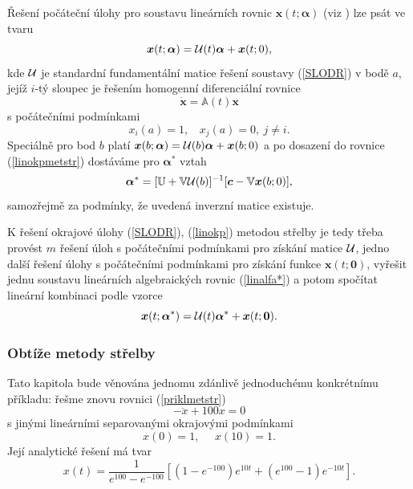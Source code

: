 \documentclass[a4paper, 12pt]{book}
\theoremstyle{definition}
\def\vc#1{\mathbf{\boldsymbol{#1}}}     %
\def\tn#1{{\mathbb{#1}}}    %
\begin{document}
Řešení počáteční úlohy pro soustavu lineárních rovnic $\vc x(t;\vc\alpha)$ (viz 
\cite{Nagy}) lze psát ve tvaru
\begin{displaymath}
\vc x(t;\vc\alpha)={\cal U}(t)\vc\alpha+\vc x(t;0),
\end{displaymath}
kde $\cal U$ je standardní fundamentální matice řešení soustavy 
(\ref{SLODR}) v bodě $a$, jejíž $i$-tý sloupec je řešením homogenní diferenciální 
rovnice
\begin{equation}\label{DRproSFM}
\dot {\vc x}={\tn A}(t)\vc x
\end{equation}
s počátečními podmínkami
\begin{equation}\label{OKPproSFM}
x_i(a)=1, ~~~~ x_j(a)=0, ~j\neq i.
\end{equation}
Speciálně pro bod $b$ platí $\vc x(b;\vc\alpha)={\cal U}(b)\vc\alpha+\vc x(b;0)$ a po
dosazení do rovnice (\ref{linokpmetstr}) dostáváme pro $\vc\alpha^*$ vztah
\begin{equation}\label{linalfa*}
\vc\alpha^* = [{\tn U}+{\tn V}{\cal U}(b)]^{-1}[\vc c-{\tn V}\vc x(b;0)],
\end{equation}
samozřejmě za podmínky, že uvedená inverzní matice existuje.

K řešení okrajové úlohy (\ref{SLODR}), (\ref{linokp}) metodou střelby je tedy
třeba provést $m$ řešení úloh s počátečními podmínkami pro získání matice $\cal U$,
jedno další řešení úlohy s počátečními podmínkami pro získání funkce $\vc x(t;\vc 0)$,
vyřešit jednu soustavu lineárních algebraických rovnic (\ref{linalfa*}) a potom
spočítat lineární kombinaci podle vzorce
\begin{equation}\label{linreseni}
\vc x(t;\vc\alpha^*) = {\cal U}(t)\vc\alpha^*+\vc x(t;\vc 0).
\end{equation}

\subsubsection{Obtíže metody střelby}
Tato kapitola bude věnována jednomu zdánlivě jednoduchému konkrétnímu příkladu: 
řešme znovu rovnici (\ref{priklmetstr})
\begin{displaymath}
-\ddot x + 100 x = 0
\end{displaymath}
s jinými lineárními separovanými okrajovými podmínkami
\begin{equation}\label{priklOKP2}
x(0)=1, ~~~~~~ x(10)=1.
\end{equation}
Její analytické řešení má tvar
\begin{equation}\label{reseniprikl1}
x(t)=\frac 1{e^{100}-e^{-100}} \left[(1-e^{-100}) e^{10t}+(e^{100}-1) e^{-10t}\right].
\end{equation}
\end{document}
